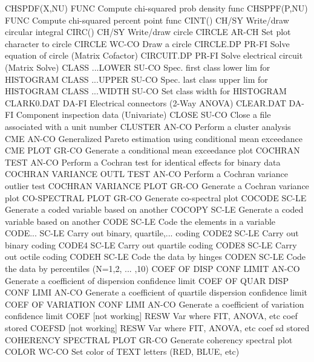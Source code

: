 CHSPDF(X,NU)                FUNC  Compute chi-squared prob density func
CHSPPF(P,NU)                FUNC  Compute chi-squared percent point func
CINT()                      CH/SY Write/draw circular integral
CIRC()                      CH/SY Write/draw circle
CIRCLE                      AR-CH Set plot character to circle
CIRCLE                      WC-CO Draw a circle
CIRCLE.DP                   PR-FI Solve equation of circle (Matrix Cofactor)
CIRCUIT.DP                  PR-FI Solve electrical circuit (Matrix Solve)
CLASS ...LOWER              SU-CO Spec. first class lower lim for HISTOGRAM
CLASS ...UPPER              SU-CO Spec. last class upper lim for HISTOGRAM
CLASS ...WIDTH              SU-CO Set class width for HISTOGRAM
CLARK0.DAT                  DA-FI Electrical connectors (2-Way ANOVA)
CLEAR.DAT                   DA-FI Component inspection data (Univariate)
CLOSE                       SU-CO Close a file associated with a unit number
CLUSTER                     AN-CO Perform a cluster analysis
CME                         AN-CO Generalized Pareto estimation using conditional mean exceedance
CME PLOT                    GR-CO Generate a conditional mean exceedance plot
COCHRAN TEST                AN-CO Perform a Cochran test for identical effects for binary data
COCHRAN VARIANCE OUTL TEST  AN-CO Perform a Cochran variance outlier test
COCHRAN VARIANCE PLOT       GR-CO Generate a Cochran variance plot
CO-SPECTRAL PLOT            GR-CO Generate co-spectral plot
COCODE                      SC-LE Generate a coded variable based on another
COCOPY                      SC-LE Generate a coded variable based on another
CODE                        SC-LE Code the elements in a variable
CODE...                     SC-LE Carry out binary, quartile,... coding
CODE2                       SC-LE Carry out binary coding
CODE4                       SC-LE Carry out quartile coding
CODE8                       SC-LE Carry out octile coding
CODEH                       SC-LE Code the data by hinges
CODEN                       SC-LE Code the data by percentiles (N=1,2, ... ,10)
COEF OF DISP CONF LIMIT     AN-CO Generate a coefficient of dispersion confidence limit
COEF OF QUAR DISP CONF LIMI AN-CO Generate a coefficient of quartile dispersion confidence limit
COEF OF VARIATION CONF LIMI AN-CO Generate a coefficient of variation confidence limit
COEF [not working]          RESW  Var where FIT, ANOVA, etc coef stored
COEFSD [not working]        RESW  Var where FIT, ANOVA, etc coef sd stored
COHERENCY SPECTRAL PLOT     GR-CO Generate coherency spectral plot
COLOR                       WC-CO Set color of TEXT letters (RED, BLUE, etc)
